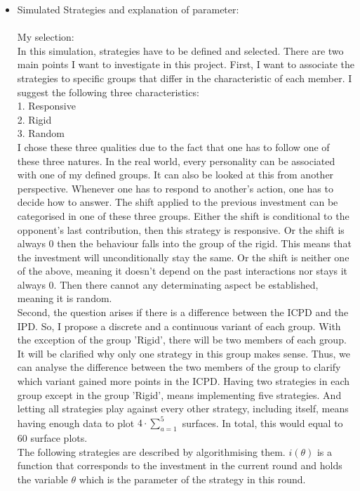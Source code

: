 \documentclass{article}
\begin{document}
\begin{itemize}
	\item Simulated Strategies and explanation of parameter:\\
		\\My selection:\\
In this simulation, strategies have to be defined and selected.
There are two main points I want to investigate in this project.
First, I want to associate the strategies to specific groups that differ in the characteristic of each member.
I suggest the following three characteristics:
\\1. Responsive
\\2. Rigid
\\3. Random\\
I chose these three qualities due to the fact that one has to follow one of these three natures.
In the real world, every personality can be associated with one of my defined groups.
It can also be looked at this from another perspective.
Whenever one has to respond to another's action, one has to decide how to answer.
The shift applied to the previous investment can be categorised in one of these three groups.
Either the shift is conditional to the opponent's last contribution, then this strategy is responsive.
Or the shift is always 0 then the behaviour falls into the group of the rigid.
This means that the investment will unconditionally stay the same.
Or the shift is neither one of the above, meaning it doesn't depend on the past interactions nor stays it always 0.
Then there cannot any determinating aspect be established, meaning it is random.
\\Second, the question arises if there is a difference between the ICPD and the IPD.
So, I propose a discrete and a continuous variant of each group.
With the exception of the group 'Rigid', there will be two members of each group.
It will be clarified why only one strategy in this group makes sense.
Thus, we can analyse the difference between the two members of the group to clarify which variant gained more points in the ICPD.
Having two strategies in each group except in the group 'Rigid', means implementing five strategies.
And letting all strategies play against every other strategy, including itself, means having enough data to plot $4 \cdot \sum_{a=1}^{5}$ surfaces.
In total, this would equal to 60 surface plots.\\
The following strategies are described by algorithmising them.
$i(\theta)$ is a function that corresponds to the investment in the current round and holds the variable $\theta$ which is the parameter of the strategy in this round.

\end{itemize}
\end{document}
